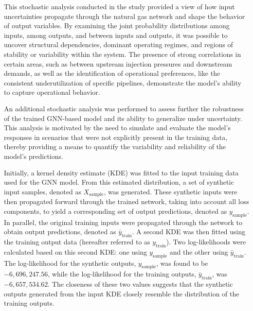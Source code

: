 This stochastic analysis conducted in the study provided a view of how input uncertainties propagate through the natural gas network and shape the behavior of output variables. By examining the joint probability distributions among inputs, among outputs, and between inputs and outputs, it was possible to uncover structural dependencies, dominant operating regimes, and regions of stability or variability within the system. The presence of strong correlations in certain areas, such as between upstream injection pressures and downstream demands, as well as the identification of operational preferences, like the consistent underutilization of specific pipelines, demonstrate the model’s ability to capture operational behavior. 

An additional stochastic analysis was performed to assess further the robustness of the trained GNN-based model and its ability to generalize under uncertainty. This analysis is motivated by the need to simulate and evaluate the model's responses in scenarios that were not explicitly present in the training data, thereby providing a means to quantify the variability and reliability of the model's predictions.

Initially, a kernel density estimate (KDE) was fitted to the input training data used for the GNN model. From this estimated distribution, a set of synthetic input samples, denoted as \( X_{\text{sample}} \), was generated. These synthetic inputs were then propagated forward through the trained network, taking into account all loss components, to yield a corresponding set of output predictions, denoted as \( y_{\text{sample}} \). In parallel, the original training inputs were propagated through the network to obtain output predictions, denoted as \(\bar{y}_{\text{train}}\). A second KDE was then fitted using the training output data (hereafter referred to as \(y_{\text{train}}\)). Two log-likelihoods were calculated based on this second KDE: one using \(y_{\text{sample}}\) and the other using \(\bar{y}_{\text{train}}\). The log-likelihood for the synthetic outputs, \(y_{\text{sample}}\), was found to be \(-6,696,247.56\), while the log-likelihood for the training outputs, \(\bar{y}_{\text{train}}\), was \(-6,657,534.62\). The closeness of these two values suggests that the synthetic outputs generated from the input KDE closely resemble the distribution of the training outputs.


